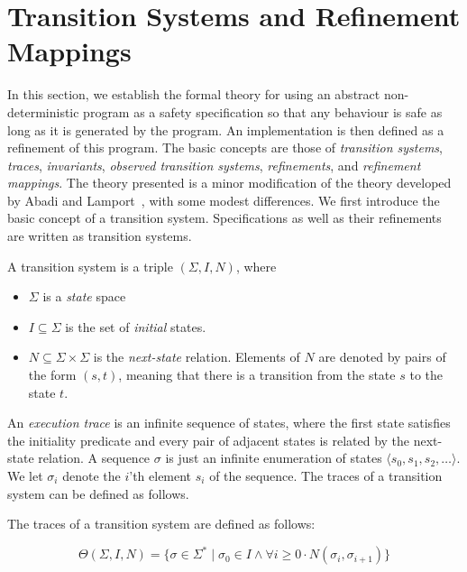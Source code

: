 
\section{Transition Systems and Refinement Mappings}
\label{transition-systems}

In this section,  we establish the  formal theory for using an abstract
non-deterministic program as   a safety specification so  that any
behaviour is safe as long as it is generated by the program.  An implementation
is then defined as  a refinement of  this program.  The basic concepts
are those of {\em transition systems}, {\em traces}, {\em invariants},
{\em  observed  transition   systems},   {\em refinements},   and {\em
  refinement mappings}.  The  theory presented is a minor modification
of the theory developed by Abadi and Lamport~\cite{AL:Mappings}, 
with some modest differences.     We first introduce   the basic concept of  a
transition system.  Specifications as  well as their refinements
are written as transition systems.

\begin{definition}
A transition system is a triple $(\Sigma,I,N)$, where

\begin{itemize}

  \item $\Sigma$ is a {\em state} space

  \item $I \subseteq \Sigma$ is the set of {\em initial} states.

  \item $N \subseteq \Sigma \times \Sigma$ is the {\em next-state} relation.
        Elements of $N$ are denoted by pairs of the form $(s,t)$, meaning that
        there is a transition from the state $s$ to the state $t$.

\end{itemize}
\end{definition}

\noindent
An {\em execution trace\/}  is an infinite sequence of
states,  where  the first state  satisfies  the initiality predicate and
every pair  of adjacent states is  related  by the  next-state
relation.  A 
sequence $\sigma$  is just an infinite enumeration  of states $\langle s_0,
s_1,  s_2, \ldots \rangle$.     We  let $\sigma_i$ denote  the  $i$'th
element $s_i$  of the  sequence.    The traces of   a transition
system can be defined as follows.

\begin{definition}[Traces]
\label{def-traces}
  The traces of a transition system are defined as follows:

\[
\Theta(\Sigma,I,N) = \{ \sigma \in \Sigma^* \mid 
                          \sigma_0 \in I \wedge
                          \forall i \ge 0 \cdot N(\sigma_i,\sigma_{i+1}) \}
\] 
\end{definition}

